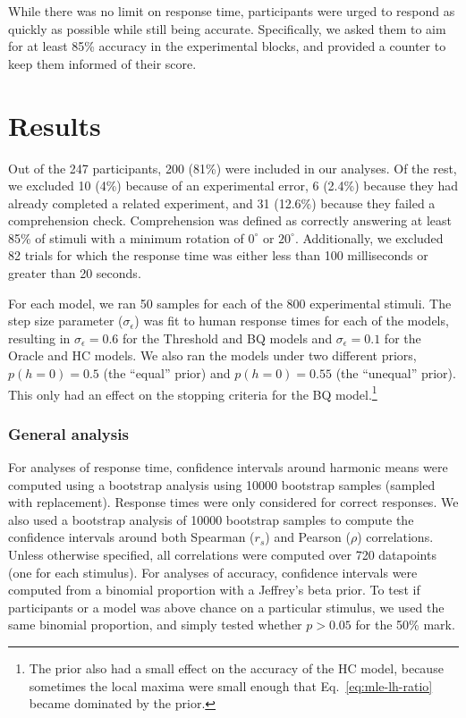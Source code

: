 \documentclass[10pt,letterpaper]{article}
\newcommand{\Oc}[0]{Oracle}
\newcommand{\Th}[0]{Threshold}
\newcommand{\Hc}[0]{HC}
\newcommand{\Bq}[0]{BQ}
\begin{document}
While there was no limit on response time, participants were urged to
respond as quickly as possible while still being
accurate. Specifically, we asked them to aim for at least 85\%
accuracy in the experimental blocks, and provided a counter to keep
them informed of their score.

\section{Results}

Out of the 247 participants, 200 (81\%) were included in our
analyses. Of the rest, we excluded 10 (4\%) because of an experimental
error, 6 (2.4\%) because they had already completed a related
experiment, and 31 (12.6\%) because they failed a comprehension
check. Comprehension was defined as correctly answering at least 85\%
of stimuli with a minimum rotation of $0^\circ$ or $20^\circ$.
Additionally, we excluded 82 trials for which the response time was
either less than 100 milliseconds or greater than 20 seconds.

For each model, we ran 50 samples for each of the 800 experimental
stimuli. The step size parameter ($\sigma_\epsilon$) was fit to human
response times for each of the models, resulting in
$\sigma_\epsilon=0.6$ for the \Th{} and \Bq{} models and
$\sigma_\epsilon=0.1$ for the \Oc{} and \Hc{} models. We also ran the
models under two different priors, $p(h=0)=0.5$ (the ``equal'' prior)
and $p(h=0)=0.55$ (the ``unequal'' prior). This only had an effect on
the stopping criteria for the \Bq{} model.\footnote{The prior also had
  a small effect on the accuracy of the \Hc{} model, because sometimes
  the local maxima were small enough that Eq.~\ref{eq:mle-lh-ratio}
  became dominated by the prior.}

\subsubsection{General analysis}

For analyses of response time, confidence intervals around harmonic
means were computed using a bootstrap analysis using 10000 bootstrap
samples (sampled with replacement). Response times were only
considered for correct responses.  We also used a bootstrap analysis
of 10000 bootstrap samples to compute the confidence intervals around
both Spearman ($r_s$) and Pearson ($\rho$) correlations.  Unless
otherwise specified, all correlations were computed over 720
datapoints (one for each stimulus). For analyses of accuracy,
confidence intervals were computed from a binomial proportion with a
Jeffrey's beta prior.  To test if participants or a model was above
chance on a particular stimulus, we used the same binomial proportion,
and simply tested whether $p>0.05$ for the 50\% mark.
\end{document}
